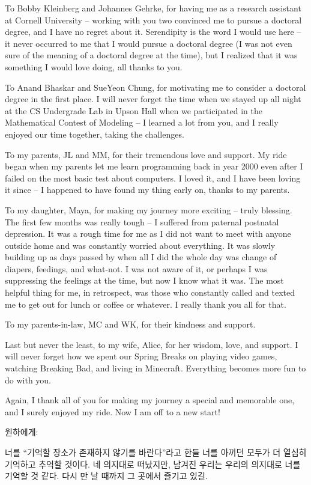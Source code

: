 To Bobby Kleinberg and Johannes Gehrke, for having me as a research assistant at Cornell University -- working with you two convinced me to pursue a doctoral degree, and I have no regret about it. Serendipity is the word I would use here -- it never occurred to me that I would pursue a doctoral degree (I was not even sure of the meaning of a doctoral degree at the time), but I realized that it was something I would love doing, all thanks to you. 

To Anand Bhaskar and SueYeon Chung, for motivating me to consider a doctoral degree in the first place. I will never forget the time when we stayed up all night at the CS Undergrade Lab in Upson Hall when we participated in the Mathematical Contest of Modeling -- I learned a lot from you, and I really enjoyed our time together, taking the challenges.

To my parents, JL and MM, for their tremendous love and support. My ride began when my parents let me learn programming back in year 2000 even after I failed on the most basic test about computers. I loved it, and I have been loving it since -- I happened to have found my thing early on, thanks to my parents. 

To my daughter, Maya, for making my journey more exciting -- truly blessing. The first few months was really tough -- I suffered from paternal postnatal depression. It was a rough time for me as I did not want to meet with anyone outside home and was constantly worried about everything. It was slowly building up as days passed by when all I did the whole day was change of diapers, feedings, and what-not. I was not aware of it, or perhaps I was suppressing the feelings at the time, but now I know what it was. The most helpful thing for me, in retrospect, was those who constantly called and texted me to get out for lunch or coffee or whatever. I really thank you all for that.

To my parents-in-law, MC and WK, for their kindness and support.

Last but never the least, to my wife, Alice, for her wisdom, love, and support. I will never forget how we spent our Spring Breaks on playing video games, watching Breaking Bad, and living in Minecraft. Everything becomes more fun to do with you.

Again, I thank all of you for making my journey a special and memorable one, and I surely enjoyed my ride. Now I am off to a new start!


\vspace{4 em}

원하에게: 

너를 ``기억할 장소가 존재하지 않기를 바란다''라고 한들 너를 아끼던 모두가 더 열심히 기억하고 추억할 것이다. 네 의지대로 떠났지만, 남겨진 우리는 우리의 의지대로 너를 기억할 것 같다. 다시 만 날 때까지 그 곳에서 즐기고 있길.
